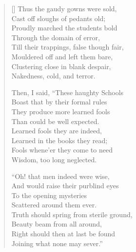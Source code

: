 \begin{verse}[\versewidth]
Thus the gaudy gowns were sold, \\
Cast off sloughs of pedants old; \\
Proudly marched the students bold \\
Through the domain of error, \\
Till their trappings, false though fair, \\
Mouldered off and left them bare, \\
Clustering close in blank despair, \\
Nakedness, cold, and terror. 
 
Then, I said, ``These haughty Schools \\
Boast that by their formal rules \\
They produce more learned fools \\
Than could be well expected. \\
Learned fools they are indeed, \\
Learned in the books they read; \\
Fools whene'er they come to need \\
Wisdom, too long neglected.
 
``Oh! that men indeed were wise, \\
And would raise their purblind eyes \\
To the opening mysteries \\
Scattered around them ever. \\
Truth should spring from sterile ground, \\
Beauty beam from all around, \\
Right should then at last be found \\
Joining what none may sever.'' 
\end{verse}

